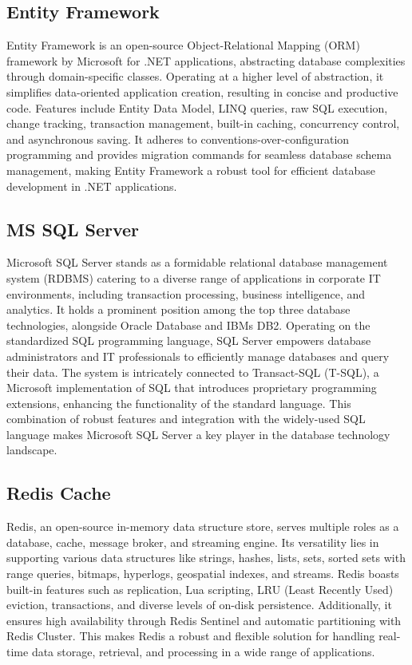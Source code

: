 \subsection{Entity Framework}

Entity Framework is an open-source Object-Relational Mapping (ORM)
framework by Microsoft for .NET applications, abstracting database
complexities through domain-specific classes. Operating at a higher
level of abstraction, it simplifies data-oriented application creation,
resulting in concise and productive code. Features include Entity Data
Model, LINQ queries, raw SQL execution, change tracking, transaction
management, built-in caching, concurrency control, and asynchronous
saving. It adheres to conventions-over-configuration programming and
provides migration commands for seamless database schema management,
making Entity Framework a robust tool for efficient database development
in .NET applications.


\subsection{MS SQL Server}

Microsoft SQL Server stands as a formidable relational database
management system (RDBMS) catering to a diverse range of applications in
corporate IT environments, including transaction processing, business
intelligence, and analytics. It holds a prominent position among the top
three database technologies, alongside Oracle Database and
IBM\textquotesingle s DB2. Operating on the standardized SQL programming
language, SQL Server empowers database administrators and IT
professionals to efficiently manage databases and query their data. The
system is intricately connected to Transact-SQL (T-SQL), a Microsoft
implementation of SQL that introduces proprietary programming
extensions, enhancing the functionality of the standard language. This
combination of robust features and integration with the widely-used SQL
language makes Microsoft SQL Server a key player in the database
technology landscape.


\subsection{Redis Cache}

Redis, an open-source in-memory data structure store, serves multiple
roles as a database, cache, message broker, and streaming engine. Its
versatility lies in supporting various data structures like strings,
hashes, lists, sets, sorted sets with range queries, bitmaps, hyperlogs,
geospatial indexes, and streams. Redis boasts built-in features such as
replication, Lua scripting, LRU (Least Recently Used) eviction,
transactions, and diverse levels of on-disk persistence. Additionally,
it ensures high availability through Redis Sentinel and automatic
partitioning with Redis Cluster. This makes Redis a robust and flexible
solution for handling real-time data storage, retrieval, and processing
in a wide range of applications.


